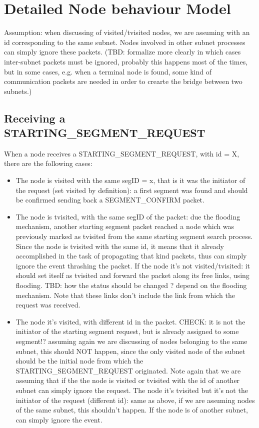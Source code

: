 \documentclass[final,journal,letterpaper]{IEEEtran}
\begin{document}
\section{Detailed Node behaviour Model}


Assumption: when discussing of visited/tvisited nodes, we are assuming
with an id corresponding to the same subnet. Nodes involved in other
subnet processes can simply ignore these packets. (TBD: formalize more
clearly in which cases inter-subnet packets must be ignored, probably
this happens most of the times, but in some cases, e.g. when a
terminal node is found, some kind of communication packets are needed
in order to crearte the bridge between two subnets.) 

\subsection{Receiving a STARTING\_SEGMENT\_REQUEST}

When a node receives a STARTING\_SEGMENT\_REQUEST, with id = X,  there
are the following cases:

\begin{itemize}
\item The node is visited with the same segID = x, that is it was the
initiator of the request (set visited by definition): a first segment
was found and should be confirmed sending back a SEGMENT\_CONFIRM
packet.  

\item The node is tvisited, with the same segID of the packet: due
the flooding mechanism, another starting segment packet reached a node
which was previously marked as tvisited from the same starting segment
search process. Since the node is tvisited with the same id, it means
that it already accomplished in the task of propagating that kind
packets, thus can simply ignore the event thrashing the packet.  If
the node it's not visited/tvisited: it should set itself as tvisited
and forward the packet along its free links, using flooding. TBD: how
the status should be changed ? depend on the flooding mechanism. Note
that these links don’t include the link from which the request was
received.  

\item The node it's visited, with different id in the packet.
CHECK:  it is not the initiator of the starting segment request, but
is already assigned to some segment!? assuming again we are discussing
of nodes belonging to the same subnet, this should NOT happen, since
the only visited node of the subnet should be the initial node from
which the STARTING\_SEGMENT\_REQUEST originated. Note again that we are
assuming that if the the node is visited or tvisited with the id of
another subnet can simply ignore the request.  The node it's tvisited
but it's not the initiator of the request (different id): same as
above, if we are assuming nodes of the same subnet, this shouldn’t
happen. If the node is of another subnet, can simply ignore the event.

\end{itemize}
\end{document}
